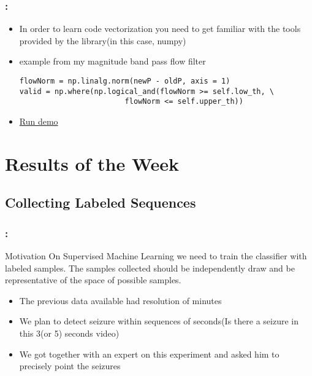 \documentclass{beamer}
\begin{document}
\begin{frame}[fragile]
  \frametitle{\secname : \subsecname}
  \begin{itemize}
      \item In order to learn code vectorization you need to get familiar with the tools provided by the library(in this
        case, numpy)
      \item example from my magnitude band pass flow filter
        \begin{scriptsize}
\begin{verbatim}
flowNorm = np.linalg.norm(newP - oldP, axis = 1)
valid = np.where(np.logical_and(flowNorm >= self.low_th, \
                        flowNorm <= self.upper_th))
\end{verbatim}
        \end{scriptsize}
      \item  \href{run:runVectorization.sh}{Run demo}
    \end{itemize}

\end{frame}
\section{Results of the Week}
\subsection{Collecting Labeled Sequences}

\begin{frame}[fragile]
  \frametitle{\secname : \subsecname}
  \begin{alertblock}{Motivation}
    On Supervised Machine Learning we need to train the classifier with labeled samples. The samples collected should be
    independently draw and be representative of the space of possible samples.
  \end{alertblock}

  \begin{itemize}
     \item The previous data available had resolution of minutes
     \item We plan to detect seizure within sequences of seconds(Is there a seizure in this 3(or 5) seconds video)
     \item We got together with an expert on this experiment and asked him to precisely point the seizures
  \end{itemize}
\end{frame}
\end{document}
